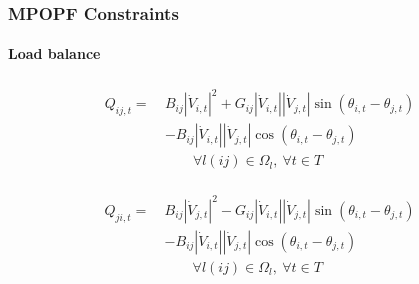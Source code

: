 \documentclass[
	11pt, %
	aspectratio=169, %
]{beamer}
\begin{document}


\begin{frame}
	\frametitle{MPOPF Constraints}
	\framesubtitle{Load balance} %

	\begin{align}
	\label{eq:Mexpr_q_flow_ij}
		\begin{split}
			Q_{ij,t} =\ &B_{ij}\left\lvert \dot{V}_{i,t}\right\rvert^{2} + G_{ij}\left\lvert \dot{V}_{i,t}\right\rvert\left\lvert \dot{V}_{j,t}\right\rvert \sin{\left(\theta_{i,t}-\theta_{j,t}\right)} \\
			&- B_{ij}\left\lvert \dot{V}_{i,t}\right\rvert\left\lvert \dot{V}_{j,t}\right\rvert \cos{\left(\theta_{i,t}-\theta_{j,t}\right)} \\[1em]
			&\qquad \forall l(ij) \in \Omega_{l},\ \forall t \in T
		\end{split}
	\end{align}

	\begin{align}
	\label{eq:Mexpr_q_flow_ji}
		\begin{split}
			Q_{ji,t} =\ &B_{ij}\left\lvert \dot{V}_{j,t}\right\rvert^{2} - G_{ij}\left\lvert \dot{V}_{i,t}\right\rvert\left\lvert \dot{V}_{j,t}\right\rvert \sin{\left(\theta_{i,t}-\theta_{j,t}\right)} \\
			&- B_{ij}\left\lvert \dot{V}_{i,t}\right\rvert\left\lvert \dot{V}_{j,t}\right\rvert \cos{\left(\theta_{i,t}-\theta_{j,t}\right)} \\[1em]
			&\qquad \forall l(ij) \in \Omega_{l},\ \forall t \in T
		\end{split}
\end{align}

\end{frame}

\end{document}
